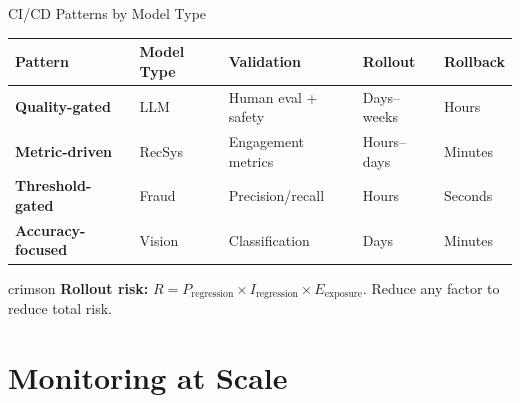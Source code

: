\documentclass[aspectratio=169, 12pt]{beamer}
\begin{document}
\begin{frame}{CI/CD Patterns by Model Type}

\footnotesize
\renewcommand{\arraystretch}{1.15}
\begin{tabular}{@{}lllll@{}}
  \toprule
  \textbf{Pattern} & \textbf{Model Type} & \textbf{Validation} & \textbf{Rollout} & \textbf{Rollback} \\
  \midrule
  \textbf{Quality-gated}   & LLM   & Human eval + safety  & Days--weeks & Hours \\
  \textbf{Metric-driven}   & RecSys & Engagement metrics  & Hours--days & Minutes \\
  \textbf{Threshold-gated} & Fraud  & Precision/recall    & Hours       & Seconds \\
  \textbf{Accuracy-focused} & Vision & Classification     & Days        & Minutes \\
  \bottomrule
\end{tabular}

\vspace{0.15cm}
\begin{mlsyscard}{crimson}
{\footnotesize \textbf{Rollout risk:} $R = P_{\text{regression}} \times I_{\text{regression}} \times E_{\text{exposure}}$. Reduce any factor to reduce total risk.}
\end{mlsyscard}

\end{frame}

\section{Monitoring at Scale}

\end{document}
